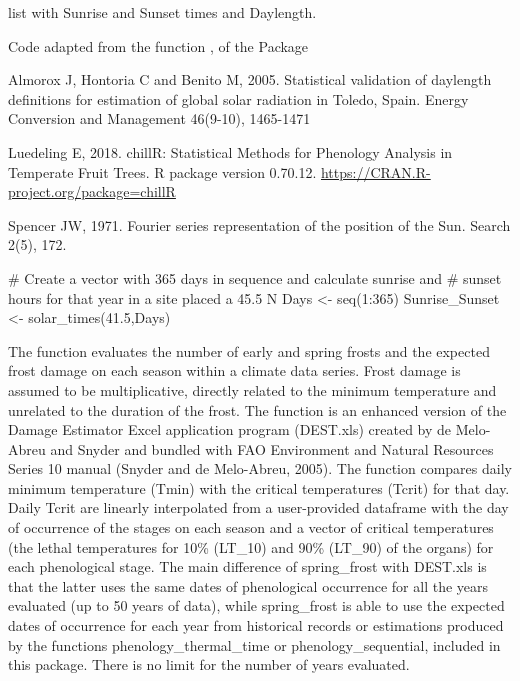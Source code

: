 \documentclass[a4paper]{book}
\begin{document}
%
\begin{Value}
list with Sunrise and Sunset times and Daylength.
\end{Value}
%
\begin{Note}\relax
Code adapted from the function , 
of the  Package
\end{Note}
%
\begin{References}\relax
Almorox J, Hontoria C and Benito M, 2005. Statistical validation of
daylength definitions for estimation of global solar radiation in Toledo,
Spain. Energy Conversion and Management 46(9-10), 1465-1471

Luedeling E, 2018. chillR: Statistical Methods for Phenology Analysis in 
Temperate Fruit Trees. R package version 0.70.12. \url{https://CRAN.R-project.org/package=chillR}

Spencer JW, 1971. Fourier series representation of the position of the Sun.
Search 2(5), 172.
\end{References}
%
\begin{Examples}
\begin{ExampleCode}

# Create a vector with 365 days in sequence and calculate sunrise and
# sunset hours for that year in a site placed a 45.5 N
Days <- seq(1:365)
Sunrise_Sunset <- solar_times(41.5,Days)

\end{ExampleCode}
\end{Examples}
%
\begin{Description}\relax
The function evaluates the number of early and spring frosts and
the expected frost damage on each season within a climate data 
series. Frost damage is assumed to be multiplicative, directly
related to the minimum temperature and unrelated to the duration
of the frost. The function is an enhanced version of the 
Damage Estimator Excel application program (DEST.xls) created by 
de Melo-Abreu and Snyder and bundled with FAO Environment and
Natural Resources Series 10 manual (Snyder and de Melo-Abreu, 2005). 
The function compares daily minimum temperature (Tmin) with the 
critical temperatures (Tcrit) for that day. Daily Tcrit are 
linearly interpolated from a user-provided dataframe with the day 
of occurrence of the stages on each season and a vector of critical 
temperatures (the lethal temperatures for 10\% (LT\_10) and 90\% (LT\_90)
of the organs) for each phenological stage. The main difference of 
spring\_frost with DEST.xls is that the latter uses the same dates of 
phenological occurrence for all the years evaluated (up to 50 years of
data), while spring\_frost is able to use the expected dates of occurrence 
for each year from historical records or estimations produced by the 
functions phenology\_thermal\_time or phenology\_sequential, included in 
this package. There is no limit for the number of years evaluated.
\end{Description}
\end{document}
